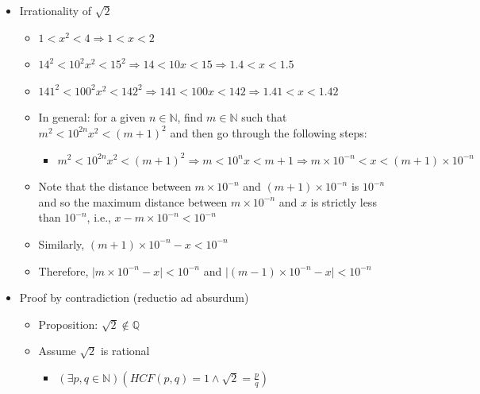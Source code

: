 \documentclass{article}
\begin{document}
\begin{itemize}
\begin{itemize}
        \item We keep on executing the above loop
        \item Given that the number of possible remainders is finite, eventually a remainder must be 0 or repeated
        \item When a zero remainder is obtained, then the the loop ends and the decimal expansion is finite. When a remainder is repeated, then we know how the loop will continue, allowing us to write down the recurring decimal expansion, which is infinite
    \end{itemize}
    \item Irrationality of $\sqrt{2}$
    \begin{itemize}
        \item $1 < x^2 < 4 \Rightarrow 1<x<2$
        \item $14^2 < 10^2x^2 < 15^2 \Rightarrow 14 < 10x < 15 \Rightarrow 1.4 < x < 1.5$
        \item $141^2 < 100^2x^2 < 142^2 \Rightarrow 141 < 100x < 142 \Rightarrow 1.41 < x < 1.42$
        \item In general: for a given $n \in \mathbb{N}$, find $m \in \mathbb{N}$ such that $m^2 < 10^{2n}x^2 < (m+1)^2$ and then go through the following steps:
        \begin{itemize}
            \item $m^2 < 10^{2n}x^2 < (m+1)^2 \Rightarrow m < 10^nx < m+1 \Rightarrow m \times 10^{-n} < x < (m+1) \times 10^{-n}$
        \end{itemize}
        \item Note that the distance between $m \times 10^{-n}$ and $(m+1) \times 10^{-n}$ is $10^{-n}$ and so the maximum distance between $m \times 10^{-n}$ and $x$ is strictly less than $10^{-n}$, i.e., $x-m \times 10^{-n} < 10^{-n}$
        \item Similarly, $(m+1) \times 10^{-n} - x < 10^{-n}$
        \item Therefore, $\vert m \times 10^{-n} -x \vert < 10^{-n}$ and $\vert (m-1) \times 10^{-n} -x \vert < 10^{-n}$
    \end{itemize}
    \item Proof by contradiction (reductio ad absurdum)
    \begin{itemize}
        \item Proposition: $\sqrt{2} \notin \mathbb{Q}$
        \item Assume $\sqrt{2}$ is rational
        \begin{itemize}
            \item $(\exists p,q \in \mathbb{N}) \left( HCF(p,q) = 1 \wedge \sqrt{2} = \frac{p}{q} \right)$

\end{itemize}
\end{itemize}
\end{itemize}
\end{document}
